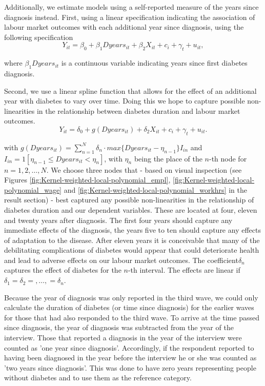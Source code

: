 \documentclass[12pt,english,british]{article}
\begin{document}
Additionally, we estimate models using a self-reported
measure of the years since diagnosis instead. First, using a linear specification
indicating the association of labour market  outcomes with each additional
year since diagnosis, using the following specification 
\begin{equation}
Y_{it}=\beta_{0}+\beta_{1}Dyears_{it}+\beta_{2}X_{it}+c_{i}+\gamma_{t}+u_{it},\label{eq:duration_linear}
\end{equation}


\noindent where $\beta_{1}Dyears_{it}$ is a continuous variable indicating
years since first diabetes diagnosis.

Second, we use a linear spline function that allows for the effect
of an additional year with diabetes to vary over time. Doing this
we hope to capture possible non-linearities in the relationship between
diabetes duration and labour market outcomes. 
\begin{equation}
Y_{it}=\delta_{0}+g(Dyears_{it})+\delta_{2}X_{it}+c_{i}+\gamma_{t}+u_{it}.\label{eq:splines}
\end{equation}


\noindent with $g(Dyears_{it})=\sum_{n=1}^{N}\delta_{n}\cdot max\{Dyears_{it}-\eta_{n-1}\}I_{in}$
and $I_{in}=1[\eta_{n-1}\leq Dyears_{it}<\eta_{n}]$, with $\eta_{n}$
being the place of the $n$-th node for $n=1,2,\ldots,N$. We choose
three nodes that - based on visual inspection (see Figures \ref{fig:Kernel-weighted-local-polynomial_empl}, \ref{fig:Kernel-weighted-local-polynomial_wage} and \ref{fig:Kernel-weighted-local-polynomial_workhrs} in the
result section) - best captured any possible non-linearities in the
relationship of diabetes duration and our dependent variables. These
are located at four, eleven and twenty years after diagnosis. The
first four years should capture any immediate effects of the diagnosis,
the years five to ten should capture any effects of adaptation to
the disease. After eleven years it is conceivable that many of the
debilitating complications of diabetes would appear that could deteriorate
health and lead to adverse effects on our labour market outcomes.
The coefficient$\delta_{n}$ captures the effect of diabetes for the
$n$-th interval. The effects are linear if $\delta_{1}=\delta_{2}=,\ldots,=\delta_{n}$.

Because the year of diagnosis was only reported in the third wave,
we could only calculate the duration of diabetes (or time since diagnosis)
for the earlier waves for those that had also responded to the third
wave. To arrive at the time passed since diagnosis, the year of diagnosis
was subtracted from the year of the interview. Those that reported
a diagnosis in the year of the interview were counted as 'one year
since diagnosis'. Accordingly, if the respondent reported to having
been diagnosed in the year before the interview he or she was counted
as 'two years since diagnosis'. This was done to have zero years representing
people without diabetes and to use them as the reference category.
\end{document}
